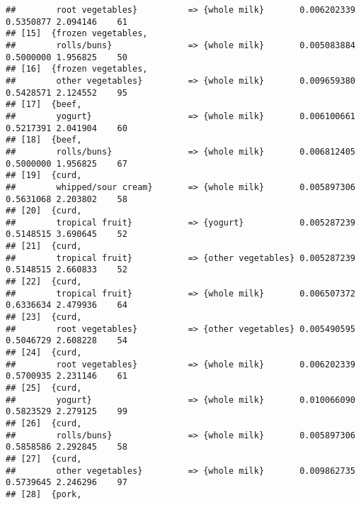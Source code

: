 \documentclass[]{article}
\begin{document}
\begin{verbatim}
##        root vegetables}          => {whole milk}       0.006202339  0.5350877 2.094146    61
## [15]  {frozen vegetables,                                                                   
##        rolls/buns}               => {whole milk}       0.005083884  0.5000000 1.956825    50
## [16]  {frozen vegetables,                                                                   
##        other vegetables}         => {whole milk}       0.009659380  0.5428571 2.124552    95
## [17]  {beef,                                                                                
##        yogurt}                   => {whole milk}       0.006100661  0.5217391 2.041904    60
## [18]  {beef,                                                                                
##        rolls/buns}               => {whole milk}       0.006812405  0.5000000 1.956825    67
## [19]  {curd,                                                                                
##        whipped/sour cream}       => {whole milk}       0.005897306  0.5631068 2.203802    58
## [20]  {curd,                                                                                
##        tropical fruit}           => {yogurt}           0.005287239  0.5148515 3.690645    52
## [21]  {curd,                                                                                
##        tropical fruit}           => {other vegetables} 0.005287239  0.5148515 2.660833    52
## [22]  {curd,                                                                                
##        tropical fruit}           => {whole milk}       0.006507372  0.6336634 2.479936    64
## [23]  {curd,                                                                                
##        root vegetables}          => {other vegetables} 0.005490595  0.5046729 2.608228    54
## [24]  {curd,                                                                                
##        root vegetables}          => {whole milk}       0.006202339  0.5700935 2.231146    61
## [25]  {curd,                                                                                
##        yogurt}                   => {whole milk}       0.010066090  0.5823529 2.279125    99
## [26]  {curd,                                                                                
##        rolls/buns}               => {whole milk}       0.005897306  0.5858586 2.292845    58
## [27]  {curd,                                                                                
##        other vegetables}         => {whole milk}       0.009862735  0.5739645 2.246296    97
## [28]  {pork,                                                                                

\end{verbatim}
\end{document}

